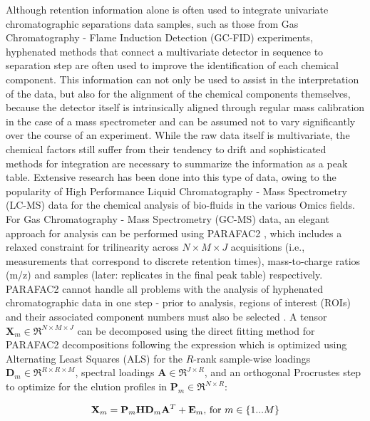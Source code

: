 \documentclass[preprint,12pt]{elsarticle}
\begin{document}
Although retention information alone is often used to integrate univariate chromatographic separations data samples, such as those from Gas Chromatography - Flame Induction Detection (GC-FID) experiments, hyphenated methods that connect a multivariate detector in sequence to separation step are often used to improve the identification of each chemical component. This information can not only be used to assist in the interpretation of the data, but also for the alignment of the chemical components themselves, because the detector itself is intrinsically aligned through regular mass calibration in the case of a mass spectrometer and can be assumed not to vary significantly over the course of an experiment. While the raw data itself is multivariate, the chemical factors still suffer from their tendency to drift and sophisticated methods for integration are necessary to summarize the information as a peak table. Extensive research has been done into this type of data, owing to the popularity of High Performance Liquid Chromatography - Mass Spectrometry (LC-MS) data for the chemical analysis of bio-fluids in the various Omics fields. For Gas Chromatography - Mass Spectrometry (GC-MS) data, an elegant approach for analysis can be performed using PARAFAC2 \cite{kiers1999parafac2}, which includes a relaxed constraint for trilinearity across $N \times M \times J$ acquisitions (i.e., measurements that correspond to discrete retention times), mass-to-charge ratios (m/z) and samples (later: replicates in the final peak table) respectively. PARAFAC2 cannot handle all problems with the analysis of hyphenated chromatographic data in one step - prior to analysis, regions of interest (ROIs) and their associated component numbers must also be selected \cite{baccolo2021untargeted,giebelhaus2022untargeted}. A tensor $\mathbf{X}_m \in \Re^{N \times M \times J}$ can be decomposed using the direct fitting method for PARAFAC2 decompositions following the expression which is optimized using Alternating Least Squares (ALS) for the $R$-rank sample-wise loadings $\mathbf{D}_m \in \Re^{R \times R \times M}$, spectral loadings $\mathbf{A} \in \Re^{J \times R}$,  and an orthogonal Procrustes step to optimize for the elution profiles in $\mathbf{P}_m \in \Re^{N \times R}$:

\begin{equation}\label{eq:pf2}
    \mathbf{X}_m = \mathbf{P}_m\mathbf{H}\mathbf{D}_m\mathbf{A}^T +\mathbf{E}_m \textnormal{, for } m \in \{1...M\}
\end{equation}
\end{document}
